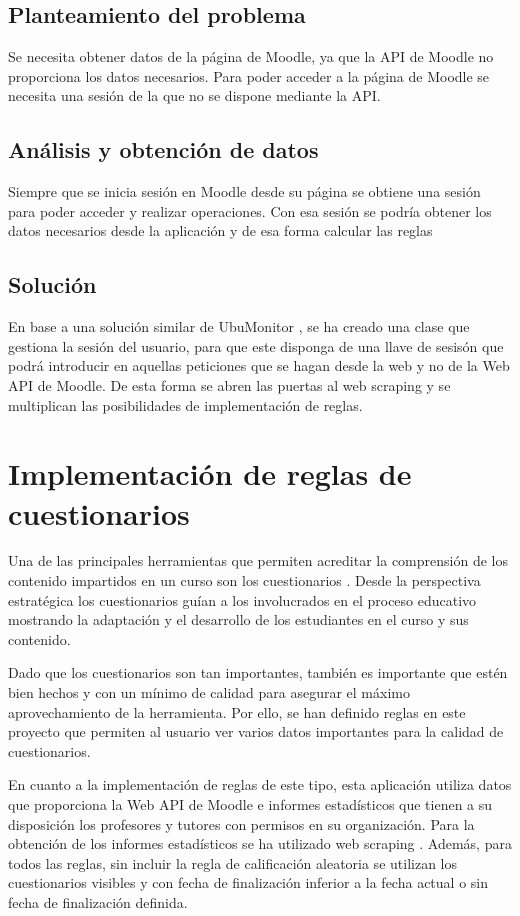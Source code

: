 \subsection{Planteamiento del problema}
Se necesita obtener datos de la página de Moodle, ya que la API de Moodle no proporciona los datos necesarios. Para poder acceder a la página de Moodle se necesita una sesión de la que no se dispone mediante la API.

\subsection{Análisis y obtención de datos}
Siempre que se inicia sesión en Moodle desde su página se obtiene una sesión para poder acceder y realizar operaciones. Con esa sesión se podría obtener los datos necesarios desde la aplicación y de esa forma calcular las reglas

\subsection{Solución}
En base a una solución similar de UbuMonitor \cite{ubu-monitor}, se ha creado una clase que gestiona la sesión del usuario, para que este disponga de una llave de sesisón que podrá introducir en aquellas peticiones que se hagan desde la web y no de la Web API de Moodle. De esta forma se abren las puertas al web scraping y se multiplican las posibilidades de implementación de reglas. 

\section{Implementación de reglas de cuestionarios}
Una de las principales herramientas que permiten acreditar la comprensión de los contenido impartidos en un curso son los cuestionarios \cite{evaluacion-de-educacion-virtual}. Desde la perspectiva estratégica los cuestionarios guían a los involucrados en el proceso educativo mostrando la adaptación y el desarrollo de los estudiantes en el curso y sus contenido.

Dado que los cuestionarios son tan importantes, también es importante que estén bien hechos y con un mínimo de calidad para asegurar el máximo aprovechamiento de la herramienta. Por ello, se han definido reglas en este proyecto que permiten al usuario ver varios datos importantes para la calidad de cuestionarios.

En cuanto a la implementación de reglas de este tipo, esta aplicación utiliza datos que proporciona la Web API de Moodle \cite{moodle-api} e informes estadísticos \cite{estadisticas-examen} que tienen a su disposición los profesores y tutores con permisos en su organización. Para la obtención de los informes estadísticos se ha utilizado web scraping \cite{web-scraping}. Además, para todos las reglas, sin incluir la regla de calificación aleatoria se utilizan los  cuestionarios visibles y con fecha de finalización inferior a la fecha actual o sin fecha de finalización definida. 

